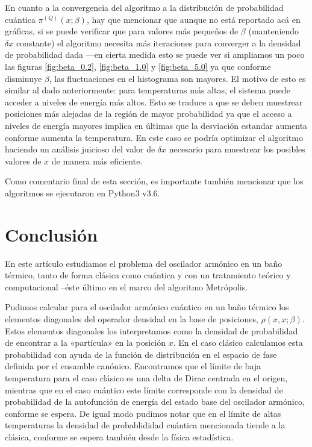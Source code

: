 \documentclass[%
 reprint,
 amsmath,amssymb,
 aps,
 pra,
]{revtex4-2}
\begin{document}
En cuanto a la convergencia del algoritmo a la distribución de probabilidad cuántica $\pi^{(Q)}(x;\beta)$, hay que mencionar que aunque no está reportado acá en gráficas, si se puede verificar que para valores más pequeños de $\beta$ (manteniendo $\delta x$ constante) el algoritmo necesita más iteraciones para converger a la densidad de probabilidad dada —en cierta medida esto se puede ver si ampliamos un poco las figuras \ref{fig:beta_0.2}, \ref{fig:beta_1.0} y \ref{fig:beta_5.0} ya que conforme disminuye $\beta$, las fluctuaciones en el histograma son mayores. El motivo de esto es similar al dado anteriormente: para temperaturas más altas, el sistema puede acceder a niveles de energía más altos. Esto se traduce a que se deben muestrear posiciones más alejadas de la región de mayor probabilidad ya que el acceso a niveles de energía mayores implica en últimas que la desviación estandar aumenta conforme aumenta la temperatura. En este caso se podría optimizar el algoritmo haciendo un análisis juicioso del valor de $\delta x$ necesario para muestrear los posibles valores de $x$ de manera más eficiente.

Como comentario final de esta sección, es importante también mencionar que los algoritmos se ejecutaron en Python3 v3.6.

\section{Conclusión\label{sec:conclusion}}

En este artículo estudiamos el problema del oscilador armónico en un baño térmico, tanto de forma clásica como cuántica y con un tratamiento teórico y computacional –éste último en el marco del algoritmo Metrópolis.

Pudimos calcular para el oscilador armónico cuántico en un baño térmico los elementos diagonales del operador densidad en la base de posiciones, $\rho(x,x;\beta)$. Estos elementos diagonales los interpretamos como la densidad de probabilidad de encontrar a la «partícula» en la posición $x$. En el caso clásico calculamos esta probabilidad con ayuda de la función de distribución en el espacio de fase definida por el ensamble canónico. Encontramos que el límite de baja temperatura para el caso clásico es una delta de Dirac centrada en el origen, mientras que en el caso cuántico este límite corresponde con la densidad de probabilidad de la autofunción de energía del estado base del oscilador armónico, conforme se espera. De igual modo pudimos notar que en el límite de altas temperaturas la densidad de probablididad cuántica mencionada tiende a la clásica, conforme se espera también desde la física estadística. 
\end{document}
